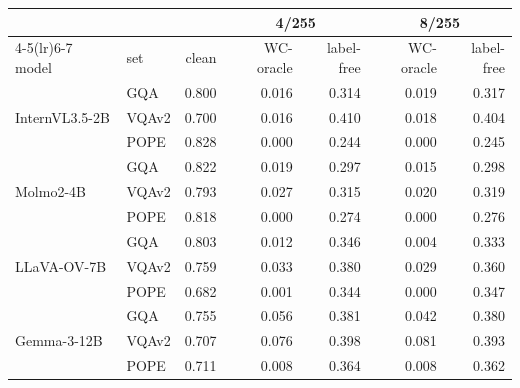\footnotesize
\setlength{\tabcolsep}{5pt}
\begin{tabular}{@{}ll rrrrr@{}}
\toprule
 &  &  & \multicolumn{2}{c}{4/255} & \multicolumn{2}{c}{8/255} \\
\cmidrule(lr){4-5}\cmidrule(lr){6-7}
model & set & clean & WC-oracle & label-free & WC-oracle & label-free \\
\midrule
\multirow{3}{*}{InternVL3.5-2B} & GQA & 0.800 & 0.016 & 0.314 & 0.019 & 0.317 \\
 & VQAv2 & 0.700 & 0.016 & 0.410 & 0.018 & 0.404 \\
 & POPE & 0.828 & 0.000 & 0.244 & 0.000 & 0.245 \\
\midrule
\multirow{3}{*}{Molmo2-4B} & GQA & 0.822 & 0.019 & 0.297 & 0.015 & 0.298 \\
 & VQAv2 & 0.793 & 0.027 & 0.315 & 0.020 & 0.319 \\
 & POPE & 0.818 & 0.000 & 0.274 & 0.000 & 0.276 \\
\midrule
\multirow{3}{*}{LLaVA-OV-7B} & GQA & 0.803 & 0.012 & 0.346 & 0.004 & 0.333 \\
 & VQAv2 & 0.759 & 0.033 & 0.380 & 0.029 & 0.360 \\
 & POPE & 0.682 & 0.001 & 0.344 & 0.000 & 0.347 \\
\midrule
\multirow{3}{*}{Gemma-3-12B} & GQA & 0.755 & 0.056 & 0.381 & 0.042 & 0.380 \\
 & VQAv2 & 0.707 & 0.076 & 0.398 & 0.081 & 0.393 \\
 & POPE & 0.711 & 0.008 & 0.364 & 0.008 & 0.362 \\
\bottomrule
\end{tabular}

